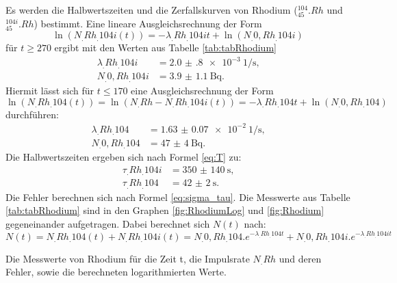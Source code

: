 Es werden die Halbwertszeiten und die Zerfallskurven von Rhodium ($^{104}_{45}.{Rh}$ und $^{104i}_{45}.{Rh}$) bestimmt.
Eine lineare Ausgleichsrechnung der Form \[\ln(N_.{Rh_.{104i}}(t))=-\lambda_.{Rh_.{104i}} t+\ln(N_.{0,Rh_.{104i}})\] für $t\geq 270$ ergibt mit den Werten aus Tabelle \ref{tab:tabRhodium}
\begin{align*}
\lambda_.{Rh_.{104i}} 	&= \SI{2.0(8)e-3}{1\per\second}\text{,}\\
N_.{0,Rh_.{104i}} 		&= \SI{3.9(11)}{\becquerel}\text{.}
\end{align*}
Hiermit lässt sich für $t\leq 170$ eine Ausgleichsrechnung der Form \[\ln(N_.{Rh_.{104}}(t))=\ln(N_.{Rh}-N_.{Rh_.{104i}}(t))=-\lambda_.{Rh_.{104}} t+\ln(N_.{0,Rh_.{104}})\] durchführen:
\begin{align*}
\lambda_.{Rh_.{104}} 	&= \SI{1.63(7)e-2}{1\per\second}\text{,}\\
N_.{0,Rh_.{104}} 		&= \SI{47(4)}{\becquerel}\text{.}
\end{align*}
Die Halbwertszeiten ergeben sich nach Formel \eqref{eq:T} zu:
\begin{align*}
\tau_.{Rh_.{104i}} 	&= \SI{350(140)}{\second}\text{,}\\
\tau_.{Rh_.{104}} &= \SI{42(2)}{\second}\text{.}
\end{align*}
Die Fehler berechnen sich nach Formel \eqref{eq:sigma_tau}. Die Messwerte aus Tabelle \ref{tab:tabRhodium} sind in den Graphen \ref{fig:RhodiumLog} und \ref{fig:Rhodium} gegeneinander aufgetragen. Dabei berechnet sich $N(t)$ nach:
\begin{equation*}
N(t)=N_.{Rh_.{104}}(t)+N_.{Rh_.{104i}}(t)=N_.{0,Rh_.{104}}.e^{-\lambda_.{Rh_.{104}} t}+N_.{0,Rh_.{104i}}.e^{-\lambda_.{Rh_.{104i}} t}
\end{equation*}

\begin{table}
	\centering
	\caption{Die Messwerte von Rhodium für die Zeit t, die Impulsrate $N_.{Rh}$ und deren Fehler, sowie die berechneten logarithmierten Werte.}
	
	\label{tab:tabRhodium}
\end{table}

\begin{table}
	\centering
	
\end{table}

